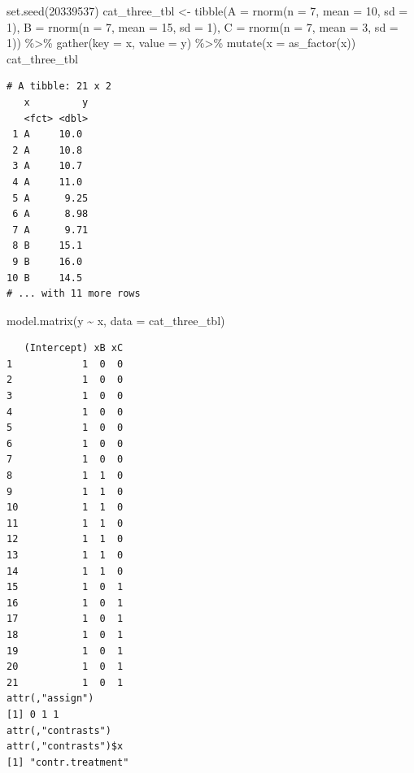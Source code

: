 \documentclass[
  letterpaper,
]{scrbook}
\newenvironment{Shaded}{\begin{snugshade}}{\end{snugshade}}
\newcommand{\AttributeTok}[1]{\textcolor[rgb]{0.40,0.45,0.13}{#1}}
\newcommand{\DecValTok}[1]{\textcolor[rgb]{0.68,0.00,0.00}{#1}}
\newcommand{\FunctionTok}[1]{\textcolor[rgb]{0.28,0.35,0.67}{#1}}
\newcommand{\NormalTok}[1]{\textcolor[rgb]{0.00,0.23,0.31}{#1}}
\newcommand{\OtherTok}[1]{\textcolor[rgb]{0.00,0.23,0.31}{#1}}
\newcommand{\SpecialCharTok}[1]{\textcolor[rgb]{0.37,0.37,0.37}{#1}}
\begin{document}
\begin{Shaded}
\begin{Highlighting}[]
\FunctionTok{set.seed}\NormalTok{(}\DecValTok{20339537}\NormalTok{)}
\NormalTok{cat\_three\_tbl }\OtherTok{\textless{}{-}} \FunctionTok{tibble}\NormalTok{(}\AttributeTok{A =} \FunctionTok{rnorm}\NormalTok{(}\AttributeTok{n =} \DecValTok{7}\NormalTok{, }\AttributeTok{mean =} \DecValTok{10}\NormalTok{, }\AttributeTok{sd =} \DecValTok{1}\NormalTok{),}
                        \AttributeTok{B =} \FunctionTok{rnorm}\NormalTok{(}\AttributeTok{n =} \DecValTok{7}\NormalTok{, }\AttributeTok{mean =} \DecValTok{15}\NormalTok{, }\AttributeTok{sd =} \DecValTok{1}\NormalTok{),}
                        \AttributeTok{C =} \FunctionTok{rnorm}\NormalTok{(}\AttributeTok{n =} \DecValTok{7}\NormalTok{, }\AttributeTok{mean =} \DecValTok{3}\NormalTok{, }\AttributeTok{sd =} \DecValTok{1}\NormalTok{)) }\SpecialCharTok{\%\textgreater{}\%} 
  \FunctionTok{gather}\NormalTok{(}\AttributeTok{key =}\NormalTok{ x, }\AttributeTok{value =}\NormalTok{ y) }\SpecialCharTok{\%\textgreater{}\%} 
  \FunctionTok{mutate}\NormalTok{(}\AttributeTok{x =} \FunctionTok{as\_factor}\NormalTok{(x))}
\NormalTok{cat\_three\_tbl}
\end{Highlighting}
\end{Shaded}

\begin{verbatim}
# A tibble: 21 x 2
   x         y
   <fct> <dbl>
 1 A     10.0 
 2 A     10.8 
 3 A     10.7 
 4 A     11.0 
 5 A      9.25
 6 A      8.98
 7 A      9.71
 8 B     15.1 
 9 B     16.0 
10 B     14.5 
# ... with 11 more rows
\end{verbatim}

\begin{Shaded}
\begin{Highlighting}[]
\FunctionTok{model.matrix}\NormalTok{(y }\SpecialCharTok{\textasciitilde{}}\NormalTok{ x, }\AttributeTok{data =}\NormalTok{ cat\_three\_tbl)}
\end{Highlighting}
\end{Shaded}

\begin{verbatim}
   (Intercept) xB xC
1            1  0  0
2            1  0  0
3            1  0  0
4            1  0  0
5            1  0  0
6            1  0  0
7            1  0  0
8            1  1  0
9            1  1  0
10           1  1  0
11           1  1  0
12           1  1  0
13           1  1  0
14           1  1  0
15           1  0  1
16           1  0  1
17           1  0  1
18           1  0  1
19           1  0  1
20           1  0  1
21           1  0  1
attr(,"assign")
[1] 0 1 1
attr(,"contrasts")
attr(,"contrasts")$x
[1] "contr.treatment"
\end{verbatim}
\end{document}
